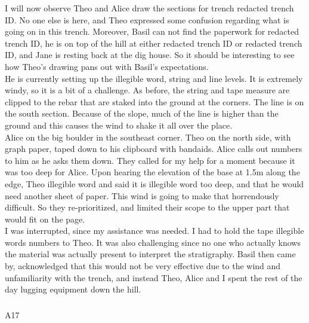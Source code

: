 \documentclass[
]{article}
\makeatletter
\let\oldsubparagraph\subparagraph
\renewcommand{\subparagraph}{
    \@ifstar
      \xxxSubParagraphStar
      \xxxSubParagraphNoStar
  }
\newcommand{\xxxSubParagraphStar}[1]{\oldsubparagraph*{#1}\mbox{}}
\newcommand{\xxxSubParagraphNoStar}[1]{\oldsubparagraph{#1}\mbox{}}
\makeatother
\begin{document}
I will now observe Theo and Alice draw the sections for trench redacted
trench ID. No one else is here, and Theo expressed some confusion
regarding what is going on in this trench. Moreover, Basil can not find
the paperwork for redacted trench ID, he is on top of the hill at either
redacted trench ID or redacted trench ID, and Jane is resting back at
the dig house. So it should be interesting to see how Theo's drawing
pans out with Basil's expectations.\\
He is currently setting up the illegible word, string and line levels.
It is extremely windy, so it is a bit of a challenge. As before, the
string and tape measure are clipped to the rebar that are staked into
the ground at the corners. The line is on the south section. Because of
the slope, much of the line is higher than the ground and this causes
the wind to shake it all over the place.\\
Alice on the big boulder in the southeast corner. Theo on the north
side, with graph paper, taped down to his clipboard with bandaids. Alice
calls out numbers to him as he asks them down. They called for my help
for a moment because it was too deep for Alice. Upon hearing the
elevation of the base at 1.5m along the edge, Theo illegible word and
said it is illegible word too deep, and that he would need another sheet
of paper. This wind is going to make that horrendously difficult. So
they re-prioritized, and limited their scope to the upper part that
would fit on the page.\\
I was interrupted, since my assistance was needed. I had to hold the
tape illegible words numbers to Theo. It was also challenging since no
one who actually knows the material was actually present to interpret
the stratigraphy. Basil then came by, acknowledged that this would not
be very effective due to the wind and unfamiliarity with the trench, and
instead Theo, Alice and I spent the rest of the day lugging equipment
down the hill.

\subparagraph{A17}\label{sec-A17}
\end{document}
